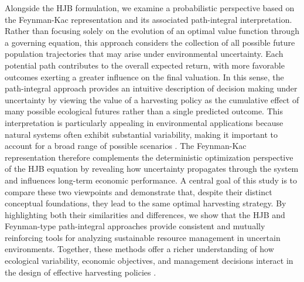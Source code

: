 \documentclass[11pt]{article}
\begin{document}
	Alongside the HJB formulation, we examine a probabilistic perspective based on the Feynman-Kac \citep{kac_1949} representation and its associated path-integral interpretation. Rather than focusing solely on the evolution of an optimal value function through a governing equation, this approach considers the collection of all possible future population trajectories that may arise under environmental uncertainty. Each potential path contributes to the overall expected return, with more favorable outcomes exerting a greater influence on the final valuation. In this sense, the path-integral approach provides an intuitive description of decision making under uncertainty by viewing the value of a harvesting policy as the cumulative effect of many possible ecological futures rather than a single predicted outcome. This interpretation is particularly appealing in environmental applications because natural systems often exhibit substantial variability, making it important to account for a broad range of possible scenarios \citep{pramanik2021optimala,pramanik2021scoring}. The Feynman-Kac representation therefore complements the deterministic optimization perspective of the HJB equation by revealing how uncertainty propagates through the system and influences long-term economic performance. A central goal of this study is to compare these two viewpoints and demonstrate that, despite their distinct conceptual foundations, they lead to the same optimal harvesting strategy. By highlighting both their similarities and differences, we show that the HJB and Feynman-type path-integral approaches provide consistent and mutually reinforcing tools for analyzing sustainable resource management in uncertain environments. Together, these methods offer a richer understanding of how ecological variability, economic objectives, and management decisions interact in the design of effective harvesting policies \citep{pramanik2024estimation,vikramdeo2024mitochondrial}.
	
\end{document}
